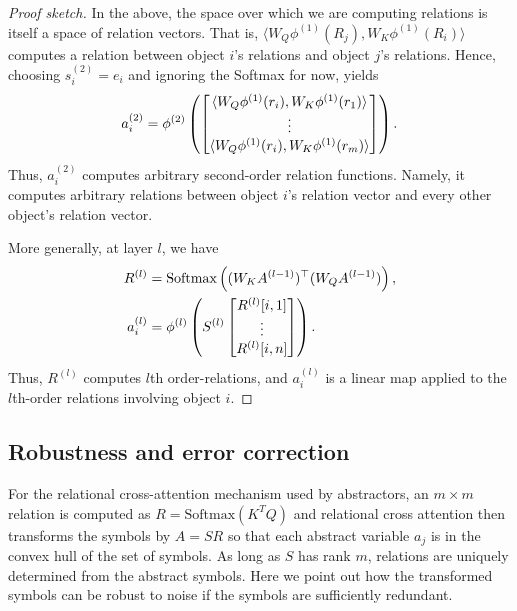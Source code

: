 \begin{proof}[Proof sketch]
	In the above, the space over which we are computing relations is itself a space of relation vectors. That is, \(\langle W_Q \phi^{(1)}(R_j), W_K \phi^{(1)}(R_i) \rangle\) computes a relation between object \(i\)'s relations and object \(j\)'s relations. Hence, choosing \(s_i^{(2)} = e_i\) and ignoring the Softmax for now, yields
	\begin{equation*}
		a_i^{(2)} = \phi^{(2)}\left(\begin{bmatrix}\langle W_Q \phi^{(1)}(r_i), W_K \phi^{(1)}(r_1) \rangle \\ \vdots \\ \langle W_Q \phi^{(1)}(r_i), W_K \phi^{(1)}(r_m) \rangle\end{bmatrix}\right).
	\end{equation*}
	Thus, \(a_i^{(2)}\) computes arbitrary second-order relation functions. Namely, it computes arbitrary relations between object \(i\)'s relation vector and every other object's relation vector.

	More generally, at layer \(l\), we have
	\begin{align*}
		R^{(l)} &= \text{Softmax}\left((W_K A^{(l-1)})^\top (W_Q A^{(l-1)})\right),\\
		a_i^{(l)} &= \phi^{(l)}\left(S^{(l)} \begin{bmatrix}R^{(l)}[i,1] \\ \vdots \\ R^{(l)}[i,n]\end{bmatrix}\right).
	\end{align*}
	Thus, \(R^{(l)}\) computes \(l\)th order-relations, and \(a_i^{(l)}\) is a linear map applied to the \(l\)th-order relations involving object \(i\).
\end{proof}


\subsection{Robustness and error correction}

For the relational cross-attention mechanism used by abstractors, an \(m\times m\) relation
is computed as  \(R = \mbox{Softmax}(K^T Q)\)
and relational cross attention then transforms the symbols by
\(A = SR\) so that each abstract variable \(a_j\) is in the convex hull of the set of symbols.
As long as \(S\) has rank \(m\), relations are uniquely determined from the abstract symbols.
Here we point out how the transformed symbols can be robust to noise if the symbols are
sufficiently redundant.

